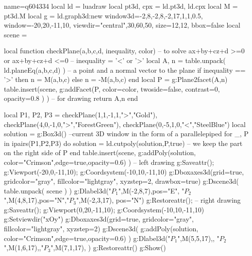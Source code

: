 \documentclass[border=5pt]{standalone}%
\begin{document}
\begin{luadraw}{name=q604334}
local ld = luadraw
local pt3d, cpx = ld.pt3d, ld.cpx
local M = pt3d.M
local g = ld.graph3d:new{ window3d={-2,8,-2,8,-2,17,1,1,0.5}, window={-20,20,-11,10}, 
    viewdir={"central",30,60,50}, size={12,12}, bbox=false }
local scene = {}

local function checkPlane(a,b,c,d, inequality, color) -- to solve ax+by+cz+d >=0 or ax+by+cz+d <=0
    -- inequality = '<' or '>'
    local A, n = table.unpack( ld.planeEq(a,b,c,d) ) -- a point and a normal vector to the plane
    if inequality == '>' then n = M(a,b,c) else n = -M(a,b,c) end
    local P = g:Plane2facet({A,n})
    table.insert(scene, g:addFacet(P, {color=color, twoside=false, contrast=0, opacity=0.8 }) ) -- for drawing
    return {A,n}
end

local P1, P2, P3 = checkPlane(1,1,-1,1,">","Gold"), checkPlane(4,0,-1,0,">","ForestGreen"),
    checkPlane(0,-5,1,0,"<","SteelBlue")
local solution = g:Box3d() --current 3D window in the form of a parallelepiped
for _, P in ipairs({P1,P2,P3}) do
    solution = ld.cutpoly(solution,P,true) -- we keep the part on the right side of P
end
table.insert(scene,  g:addPoly(solution, {color="Crimson",edge=true,opacity=0.6}) )
-- left drawing 
g:Saveattr(); g:Viewport(-20,0,-11,10); g:Coordsystem(-10,10,-11,10)
g:Dboxaxes3d({grid=true, gridcolor="gray", fillcolor="lightgray", xyzstep=2, drawbox=true})
g:Dscene3d( table.unpack( scene ) )
g:Dlabel3d("$P_1$",M(-2,8,7),{pos="E"}, "$P_2$",M(4,8,17),{pos="N"},"$P_3$",M(-2,3,17), {pos="N"})
g:Restoreattr(); 
-- right drawing
g:Saveattr(); g:Viewport(0,20,-11,10); g:Coordsystem(-10,10,-11,10)
g:Setviewdir("xOy")
g:Dboxaxes3d({grid=true, gridcolor="gray", fillcolor="lightgray", xyzstep=2})
g:Dscene3d( g:addPoly(solution, {color="Crimson",edge=true,opacity=0.6}) )
g:Dlabel3d("$P_1$",M(5,5,17),{}, "$P_2$",M(1,6,17),{},"$P_3$",M(7,1,17), {})
g:Restoreattr()
g:Show()
\end{luadraw}
\end{document}
